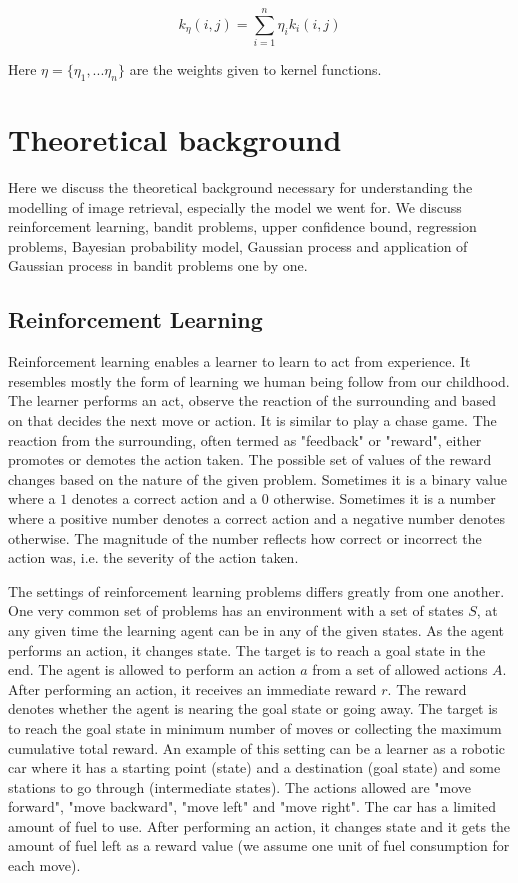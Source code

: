\documentclass[english]{tktltiki}
\begin{document}
$$
k_{\eta}(i, j) = \sum_{i=1}^n \eta_i k_i(i, j)
$$

Here $\eta = \{\eta_1, ...\eta_n\}$ are the weights given to kernel functions.

\section{Theoretical background}

Here we discuss the theoretical background necessary for understanding the modelling of image retrieval, especially the model we went for. We discuss reinforcement learning, bandit problems, upper confidence bound, regression problems, Bayesian probability model, Gaussian process and application of Gaussian process in bandit problems one by one.


\subsection{Reinforcement Learning}

Reinforcement learning enables a learner to learn to act from experience. It resembles mostly the form of learning we human being follow from our childhood. The learner performs an act, observe the reaction of the surrounding and based on that decides the next move or action. It is similar to play a chase game. The reaction from the surrounding, often termed as "feedback" or "reward", either promotes or demotes the action taken. The possible set of values of the reward changes based on the nature of the given problem. Sometimes it is a binary value where a $1$ denotes a correct action and a $0$ otherwise. Sometimes it is a number where a positive number denotes a correct action and a negative number denotes otherwise. The magnitude of the number reflects how correct or incorrect the action was, i.e. the severity of the action taken.

The settings of reinforcement learning problems differs greatly from  one another. One very common set of problems has an environment with a set of states $S$, at any given time the learning agent can be in any of the given states. As the agent performs an action, it changes state. The target is to reach a goal state in the end. The agent is allowed to perform an action $a$ from a set of allowed actions $A$. After performing an action, it receives an immediate reward $r$. The reward denotes whether the agent is nearing the goal state or going away. The target is to reach the goal state in minimum number of moves or collecting the maximum cumulative total reward. An example of this setting can be a learner as a robotic car where it has a starting point (state) and a destination (goal state) and some stations to go through (intermediate states). The actions allowed are "move forward", "move backward", "move left" and "move right". The car has a limited amount of fuel to use. After performing an action, it changes state and it gets the amount of fuel left as a reward value (we assume one unit of fuel consumption for each move).
\end{document}

